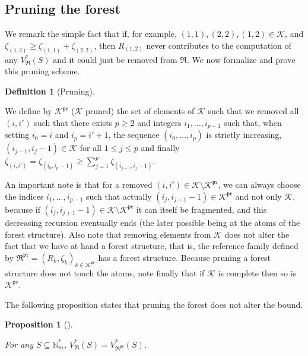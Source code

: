 \documentclass[
  11pt,
  a4paper,
]{article}
\theoremstyle{plain}
\newtheorem{proposition}{Proposition}[section]
\theoremstyle{plain}
\theoremstyle{plain}
\theoremstyle{definition}
\newtheorem{definition}{Definition}[section]
\theoremstyle{definition}
\theoremstyle{remark}
\begin{document}
\subsection{Pruning the forest}\label{sec-pruning}

We remark the simple fact that if, for example,
\((1,1), (2,2), (1,2)\in\mathcal{K}\), and
\(\zeta_{(1,2)}\geq \zeta_{(1,1)}+\zeta_{(2,2)}\), then \(R_{(1,2)}\)
never contributes to the computation of any \(V^*_{\mathfrak{R}}(S)\)
and it could just be removed from \(\mathfrak{R}\). We now formalize and
prove this pruning scheme.

\begin{definition}[Pruning]\protect\hypertarget{def-pruning}{}\label{def-pruning}

We define by \(\mathcal{K}^{\mathfrak{pr}}\) (\(\mathcal{K}\) pruned)
the set of elements of \(\mathcal{K}\) such that we removed all
\((i,i')\) such that there exists \(p\geq2\) and integers
\(i_1,\dotsc,i_{p-1}\) such that, when setting \(i_0=i\) and
\(i_{p}=i'+1\), the sequence \((i_0,\dotsc,i_{p})\) is strictly
increasing, \((i_{j-1},i_{j}-1)\in\mathcal{K}\) for all
\(1\leq j\leq p\) and finally
\(\zeta_{(i,i')}=\zeta_{(i_0,i_{p}-1)}\geq \sum_{j=1}^{p} \zeta_{(i_{j-1}, i_{j}-1)}\).

\end{definition}

An important note is that for a removed
\((i,i')\in\mathcal{K}\setminus\mathcal{K}^{\mathfrak{pr}}\), we can
always choose the indices \(i_1,\dotsc,i_{p-1}\) such that actually
\((i_j,i_{j+1}-1)\in\mathcal{K}^{\mathfrak{pr}}\) and not only
\(\mathcal{K}\), because if
\((i_j,i_{j+1}-1)\in\mathcal{K}\setminus\mathcal{K}^{\mathfrak{pr}}\) it
can itself be fragmented, and this decreasing recursion eventually ends
(the later possible being at the atoms of the forest structure). Also
note that removing elements from \(\mathcal{K}\) does not alter the fact
that we have at hand a forest structure, that is, the reference family
defined by
\(\mathfrak{R}^{\mathfrak{pr}}=(R_k,\zeta_k)_{k\in\mathcal{K}^{\mathfrak{pr}}}\)
has a forest structure. Because pruning a forest structure does not
touch the atoms, note finally that if \(\mathcal{K}\) is complete then
so is \(\mathcal{K}^{\mathfrak{pr}}\).

The following proposition states that pruning the forest does not alter
the bound.

\begin{proposition}[]\protect\hypertarget{prp-pruning}{}\label{prp-pruning}

For any \(S\subseteq \mathbb{N}_m^*\),
\(V^*_{\mathfrak{R}}(S)=V^*_{\mathfrak{R}^{\mathfrak{pr}}}(S)\).

\end{proposition}
\end{document}
